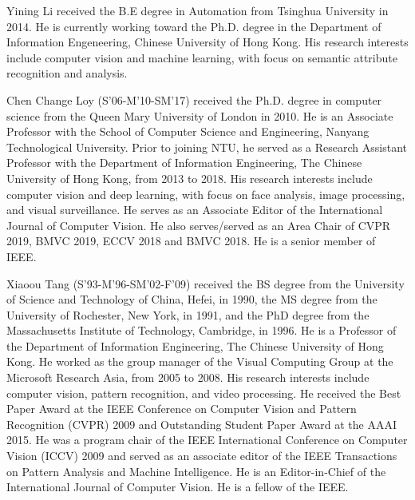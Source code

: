 \documentclass[10pt,journal,compsoc]{IEEEtran}
\begin{document}

\begin{IEEEbiography}{Yining Li}
received the B.E degree in Automation from Tsinghua University in 2014. He is currently working toward the Ph.D. degree in the Department of Information Engeneering, Chinese University of Hong Kong. His research interests include computer vision and machine learning, with focus on semantic attribute recognition and analysis.
\end{IEEEbiography}

\begin{IEEEbiography}{Chen Change Loy}
(S'06-M'10-SM'17) received the Ph.D. degree in computer science from the Queen Mary University of London in 2010. He is an Associate Professor with the School of Computer Science and Engineering, Nanyang Technological University. Prior to joining NTU, he served as a Research Assistant Professor with the Department of Information Engineering, The Chinese University of Hong Kong, from 2013 to 2018. His research interests include computer vision and deep learning, with focus on face analysis, image processing, and visual surveillance. He serves as an Associate Editor of the International Journal of Computer Vision. He also serves/served as an Area Chair of CVPR 2019, BMVC 2019, ECCV 2018 and BMVC 2018. He is a senior member of IEEE.
\end{IEEEbiography}

\begin{IEEEbiography}{Xiaoou Tang}
(S'93-M'96-SM'02-F'09) received
the BS degree from the University of Science
and Technology of China, Hefei, in 1990, the MS
degree from the University of Rochester, New
York, in 1991, and the PhD degree from the Massachusetts
Institute of Technology, Cambridge,
in 1996. He is a Professor of the Department of Information Engineering, The Chinese University of Hong Kong. He worked
as the group manager of the Visual Computing
Group at the Microsoft Research Asia, from 2005 to 2008. His research
interests include computer vision, pattern recognition, and video processing.
He received the Best Paper Award at the IEEE Conference
on Computer Vision and Pattern Recognition (CVPR) 2009 and Outstanding Student Paper Award at the AAAI 2015. He was a
program chair of the IEEE International Conference on Computer Vision
(ICCV) 2009 and served as an associate editor of the IEEE Transactions on
Pattern Analysis and Machine Intelligence. He is an Editor-in-Chief of the International Journal of Computer Vision. He is a fellow of the IEEE.
\end{IEEEbiography}
\end{document}
